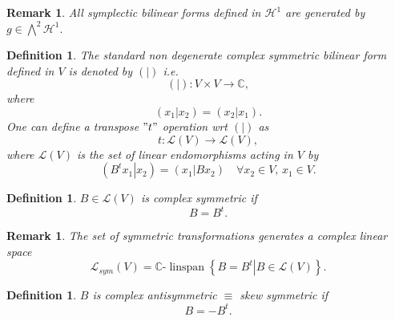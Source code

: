 \documentclass[aps,preprint]{revtex4}%
\newtheorem{definition}[theorem]{Definition}
\newtheorem{remark}[theorem]{Remark}
\begin{document}
\begin{remark}
All \emph{symplectic bilinear} forms defined in $\mathcal{H}^{1}$ are
generated by $g\in\bigwedge\nolimits^{2}\mathcal{H}^{1}.$
\end{remark}

\begin{definition}
The standard non degenerate complex symmetric bilinear form defined in $V$ is
\emph{denoted by} $\left(  \left.  {}\right\vert \right)  $ i.e.
\begin{equation}
\left(  \left.  {}\right\vert \right)  :V\times V\rightarrow\mathbb{C},
\end{equation}
where
\begin{equation}
\left(  \left.  x_{1}\right\vert x_{2}\right)  =\left(  \left.  x_{2}%
\right\vert x_{1}\right)  .
\end{equation}
One can define a \emph{transpose} $"t"$ operation wrt $\left(  \left.
{}\right\vert \right)  $ as
\begin{equation}
t:\mathcal{L}\left(  V\right)  \rightarrow\mathcal{L}\left(  V\right)  ,
\end{equation}
where $\mathcal{L}\left(  V\right)  $ is the set of linear endomorphisms
acting in $V$ by
\begin{equation}
\left(  \left.  B^{t}x_{1}\right\vert x_{2}\right)  =\left(  \left.
x_{1}\right\vert Bx_{2}\right)  \quad\forall x_{2}\in V,\,x_{1}\in V.
\end{equation}

\end{definition}

\begin{definition}
$B\in\mathcal{L}\left(  V\right)  $ is complex symmetric if
\begin{equation}
B=B^{t}.
\end{equation}

\end{definition}

\begin{remark}
The set of symmetric transformations generates a complex linear space%
\begin{equation}
\mathcal{L}_{sym}\left(  V\right)  =\mathbb{C}\text{-}\operatorname*{linspan}%
\left\{  \left.  B=B^{t}\right\vert B\in\mathcal{L}\left(  V\right)  \right\}
.
\end{equation}

\end{remark}

\begin{definition}
$B$ is complex \emph{antisymmetric }$\equiv$ \emph{skew symmetric }if
\begin{equation}
B=-B^{t}.
\end{equation}

\end{definition}
\end{document}
